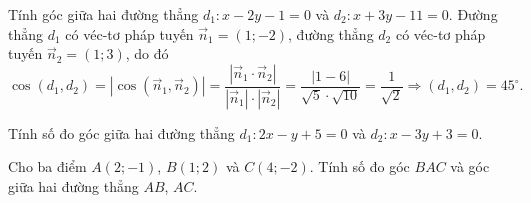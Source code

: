 \begin{bt}%
	Tính góc giữa hai đường thẳng $d_1\colon x-2y-1=0$ và $d_2\colon x+3y-11=0$.
	\loigiai
	{Đường thẳng $d_1$ có véc-tơ pháp tuyến $\overrightarrow{n}_1=(1;-2)$, đường thẳng $d_2$ có véc-tơ pháp tuyến $\overrightarrow{n}_2=(1;3)$, do đó
		$$\cos(d_1,d_2)=\left|\cos\left(\overrightarrow{n}_1,\overrightarrow{n}_2\right)\right|=\dfrac{\left|\overrightarrow{n}_1\cdot \overrightarrow{n}_2\right|}{\left|\overrightarrow{n}_1\right|\cdot\left|\overrightarrow{n}_2\right|} = \dfrac{|1-6|}{\sqrt{5}\cdot\sqrt{10}}=\dfrac{1}{\sqrt{2}} \Rightarrow (d_1,d_2)=45^\circ.$$}
\end{bt}

\begin{bt}%
	Tính số đo góc giữa hai đường thẳng $d_1\colon 2x-y+5=0$ và $d_2\colon x-3y+3=0$.
\end{bt}

\begin{bt}%
	Cho ba điểm $A(2;-1)$, $B(1;2)$ và $C(4;-2)$. Tính số đo góc $BAC$ và góc giữa hai đường thẳng $AB$, $AC$.
\end{bt}


